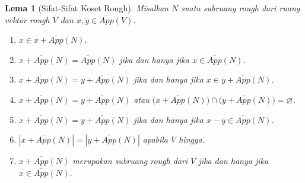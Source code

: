 \documentclass[a4paper,11pt]{article}
\theoremstyle{plain}
\newtheorem{lema}[definisi]{Lema}
\newcommand{\upp}[1]{\overline{App}(#1)}
\begin{document}
\begin{lema}[Sifat-Sifat Koset Rough]\label{lem:32}
      Misalkan $N$ suatu subruang rough dari ruang vektor rough $V$ dan
      $x,y\in\upp{V}$.
      \begin{enumerate}
            \item $x\in x+\upp{N}$.
            \item $x+\upp{N}=\upp{N}$ jika dan hanya jika $x\in\upp{N}$.
            \item $x+\upp{N}=y+\upp{N}$ jika dan hanya jika $x\in y+\upp{N}$.
            \item $x+\upp{N}=y+\upp{N}$ atau
                  $\bigl(x+\upp{N}\bigr)\cap\bigl(y+\upp{N}\bigr)=\varnothing$.
            \item $x+\upp{N}=y+\upp{N}$ jika dan hanya jika $x-y\in\upp{N}$.
            \item $|x+\upp{N}|=|y+\upp{N}|$ apabila $V$ hingga.
            \item $x+\upp{N}$ merupakan subruang rough dari $V$ jika dan hanya
                  jika $x\in\upp{N}$.
      \end{enumerate}
\end{lema}
\end{document}
